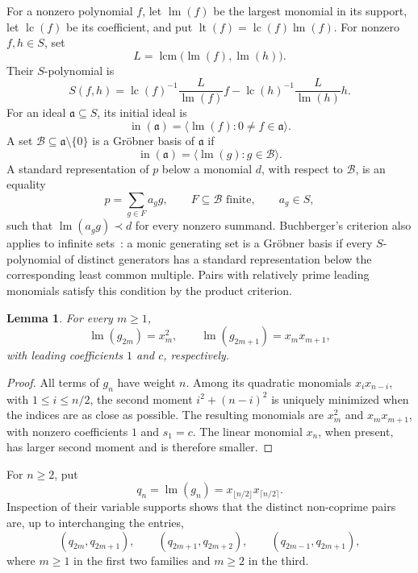 \documentclass[11pt,reqno]{amsart}
\newtheorem{lemma}[theorem]{Lemma}
\theoremstyle{definition}
\theoremstyle{remark}
\theoremstyle{plain}
\newcommand{\lm}{\operatorname{lm}}
\newcommand{\lt}{\operatorname{lt}}
\newcommand{\lc}{\operatorname{lc}}
\newcommand{\inideal}{\operatorname{in}}
\begin{document}
For a nonzero polynomial \(f\), let \(\lm(f)\) be the largest monomial
in its support, let \(\lc(f)\) be its coefficient, and put
\(\lt(f)=\lc(f)\lm(f)\).  For nonzero \(f,h\in S\), set
$$
 L=\operatorname{lcm}\bigl(\lm(f),\lm(h)\bigr).
$$
Their \(S\)-polynomial is
\begin{equation}\label{eq:S-polynomial}
 S(f,h)=
 \lc(f)^{-1}\frac{L}{\lm(f)}f-
 \lc(h)^{-1}\frac{L}{\lm(h)}h.
\end{equation}
For an ideal \(\mathfrak a\subseteq S\), its initial ideal is
$$
 \inideal(\mathfrak a)
 =\langle\lm(f):0\neq f\in\mathfrak a\rangle.
$$
A set \(\mathcal B\subseteq\mathfrak a\setminus\{0\}\) is a
Gr\"obner basis of \(\mathfrak a\) if
$$
 \inideal(\mathfrak a)=\langle\lm(g):g\in\mathcal B\rangle.
$$
A standard representation of \(p\) below a monomial \(d\), with
respect to \(\mathcal B\), is an equality
$$
 p=\sum_{g\in F}a_gg,\qquad
 F\subseteq\mathcal B\text{ finite},\qquad a_g\in S,
$$
such that \(\lm(a_gg)\prec d\) for every nonzero summand.
Buchberger's criterion also applies to infinite
sets~\cite[Proposition~1.13 and its proof]{IimaYoshino2009}: a monic generating set is a
Gr\"obner basis if every \(S\)-polynomial of distinct generators has
a standard representation below the corresponding least common
multiple.  Pairs with relatively prime leading monomials satisfy
this condition by the product criterion.

\begin{lemma}\label{lem:leading-monomials}
For every \(m\geq1\),
$$
 \lm(g_{2m})=x_m^2,\qquad
 \lm(g_{2m+1})=x_mx_{m+1},
$$
with leading coefficients \(1\) and \(c\), respectively.
\end{lemma}

\begin{proof}
All terms of \(g_n\) have weight \(n\).  Among its quadratic
monomials \(x_ix_{n-i}\), with \(1\leq i\leq n/2\), the second moment
\(i^2+(n-i)^2\) is uniquely minimized when the indices are as close
as possible.  The resulting monomials are \(x_m^2\) and
\(x_mx_{m+1}\), with nonzero coefficients \(1\) and \(s_1=c\).
The linear monomial \(x_n\), when present, has larger second moment
and is therefore smaller.
\end{proof}

For \(n\geq2\), put
$$
 q_n=\lm(g_n)
     =x_{\lfloor n/2\rfloor}x_{\lceil n/2\rceil}.
$$
Inspection of their variable supports shows that the distinct
non-coprime pairs are, up to interchanging the entries,
\begin{equation}\label{eq:overlap-families}
 (q_{2m},q_{2m+1}),\qquad
 (q_{2m+1},q_{2m+2}),\qquad
 (q_{2m-1},q_{2m+1}),
\end{equation}
where \(m\geq1\) in the first two families and \(m\geq2\) in the
third.
\end{document}
